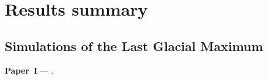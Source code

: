 \documentclass[a4paper]{kappa}
\newcommand{\CCLI}[0]{Paper~I}      %
\begin{document}




\section{Results summary}

\subsection{Simulations of the Last Glacial Maximum}

\noindent\textbf{\CCLI} --- .
\bigskip
\end{document}
